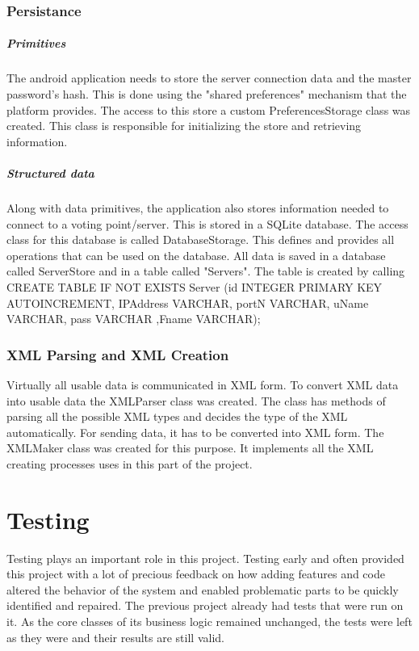 \documentclass[11pt,twoside,a4paper]{book}
\begin{document}
\subsection{Persistance}
\paragraph{Primitives}The android application needs to store the server connection data and the master password's hash. This is done using the "shared preferences" mechanism that the platform provides. The access to this store a custom PreferencesStorage class was created. This class is responsible for initializing the store and retrieving information. \\
\paragraph{Structured data}
Along with data primitives, the application also stores information needed to connect to a voting point/server. This is stored in a SQLite database. The access class for this database is called DatabaseStorage. This defines and provides all operations that can be used on the database. All data is saved in a database called ServerStore and in a table called "Servers". The table is created by calling 
CREATE TABLE IF NOT EXISTS Server (id INTEGER PRIMARY KEY AUTOINCREMENT, IPAddress VARCHAR, portN VARCHAR, uName VARCHAR, pass VARCHAR ,Fname VARCHAR);
\subsection{XML Parsing and XML Creation}
Virtually all usable data is communicated in XML form. To convert XML data into usable data the XMLParser class was created. The class has methods of parsing all the possible XML types and decides the type of the XML automatically. For sending data, it has to be converted into XML form. The XMLMaker class was created for this purpose. It implements all the XML creating processes uses in this part of the project.


\chapter{Testing}
Testing plays an important role in this project. Testing early and often provided this project with a lot of precious feedback on how adding features and code altered the behavior of the system and enabled problematic parts to be quickly identified and repaired. The previous project \cite{bakalarkaJV} already had tests that were run on it. As the core classes of its business logic remained unchanged, the tests were left as they were and their results are still valid.
\end{document}
